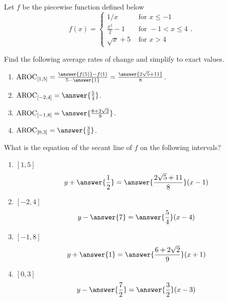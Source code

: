 \documentclass{ximera}
\author{Elizabeth Campolongo}
\begin{document}
\begin{exercise}
Let $f$ be the piecewise function defined below
\begin{equation*}
f(x) =  \begin{cases} 1/x & \text{ for }  x \leq -1 \\ 
\frac{x^2}{2}- 1 & \text{ for } -1 < x \leq 4\\ 
\sqrt{x}+5 & \text{ for } x > 4 \end{cases}.
\end{equation*}

Find the following average rates of change and simplify to exact values.
\begin{enumerate}
\item $\av_{[1,5]} = \frac{\answer{f(5)}-f(1)}{5-\answer{1}} = \frac{\answer{2\sqrt{5} + 11}}{8}$.

\item $\av_{[-2,4]} = \answer{\frac{5}{4}}$.

\item $\av_{[-1, 8]} = \answer{\frac{6+2\sqrt{2}}{9}}$.

\item $\av_{[0,3]} = \answer{\frac{3}{2}}$.
\end{enumerate}

\begin{exercise}
What is the equation of the secant line of $f$ on the following intervals?
\begin{enumerate}
\item $[1,5]$ 
$$y+ \answer{\frac{1}{2}} = \answer{\frac{2\sqrt{5} + 11}{8}}(x-1)$$

\item $[-2,4]$ 
$$y- \answer{7} = \answer{\frac{5}{4}}(x-4)$$

\item $[-1,8]$ 
$$y+ \answer{1} = \answer{\frac{6+2\sqrt{2}}{9}}(x+1)$$

\item $[0,3]$ 
$$y- \answer{\frac{7}{2}} = \answer{\frac{3}{2}}(x-3)$$

\end{enumerate}
\end{exercise}
\end{exercise}
\end{document}
